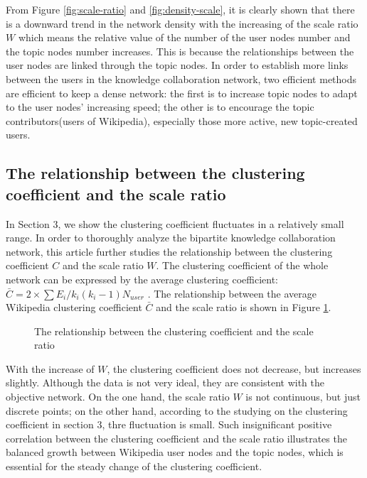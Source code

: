 \documentclass{elsarticle}
\begin{document}
From Figure \ref{fig:scale-ratio} and \ref{fig:density-scale}, it is clearly shown that there is a downward
trend in the network density with the increasing of the scale ratio $W$
which means the relative value of the number of the user nodes number
and the topic nodes number increases. This is because the relationships
between the user nodes are linked through the topic nodes.  In order to
establish more links between the users in the knowledge collaboration
network,  two efficient methods are efficient to keep a dense network:
the first is to increase topic nodes to adapt to the user nodes’
increasing speed; the other is to encourage the topic
contributors(users of Wikipedia), especially those more active, new topic-created users. 

\subsection{ The relationship between the clustering coefficient and the scale ratio}
\label{sec:relat-betw-clust}
 In Section 3, we show the clustering coefficient fluctuates in a
relatively small range.  In order to thoroughly
analyze the bipartite knowledge collaboration network, this article
further studies the relationship between the clustering coefficient $C$
and the scale ratio $W$. The clustering coefficient of the whole
network can be expressed by the average clustering coefficient:
$\bar{C}=2\times \sum E_i/k_i(k_i-1)N_{user}$ . The
relationship between the average Wikipedia clustering coefficient
$\bar{C}$ and the scale ratio is shown in Figure \ref{fig:cc-ration}. 
\begin{figure}[htpb]
  \centering
  \scalebox{0.3}{\texttt{[image: 10]}}
  \caption{The relationship between the  clustering coefficient  and
    the scale ratio}
  \label{fig:cc-ration}
\end{figure}

With the increase of $W$, the clustering coefficient does not
decrease, but increases slightly. Although the data is not very ideal,
they are consistent with the objective network. On the one hand, the
scale ratio $W$ is not continuous, but just discrete points; on the
other hand, according to the studying on the clustering coefficient in
section 3, thre fluctuation is small. Such insignificant positive correlation between the clustering coefficient and the scale ratio illustrates the balanced growth between Wikipedia user nodes and the topic nodes, which is essential for the steady change of the clustering coefficient. 
\end{document}
